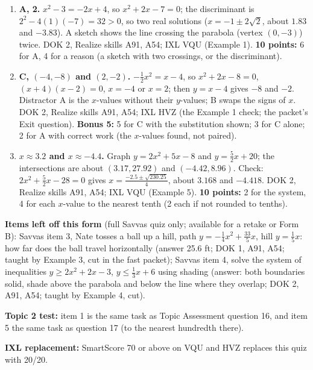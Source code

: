 \documentclass[11pt]{article}
\begin{document}
\begin{enumerate}
\item[\textbf{1.}] \textbf{A, 2.} $x^2-3=-2x+4$, so $x^2+2x-7=0$; the discriminant is $2^2-4(1)(-7)=32>0$, so two real solutions ($x=-1\pm2\sqrt2$, about $1.83$ and $-3.83$). A sketch shows the line crossing the parabola (vertex $(0,-3)$) twice. DOK 2, Realize skills A91, A54; IXL VQU (Example 1). \textbf{10 points:} 6 for A, 4 for a reason (a sketch with two crossings, or the discriminant).
\item[\textbf{2.}] \textbf{C, $(-4,-8)$ and $(2,-2)$.} $-\tfrac12x^2=x-4$, so $x^2+2x-8=0$, $(x+4)(x-2)=0$, $x=-4$ or $x=2$; then $y=x-4$ gives $-8$ and $-2$. Distractor A is the $x$-values without their $y$-values; B swaps the signs of $x$. DOK 2, Realize skills A91, A54; IXL HVZ (the Example 1 check; the packet's Exit question). \textbf{Bonus 5:} 5 for C with the substitution shown; 3 for C alone; 2 for A with correct work (the $x$-values found, not paired).
\item[\textbf{5.}] \textbf{$x\approx3.2$ and $x\approx-4.4$.} Graph $y=2x^2+5x-8$ and $y=\tfrac52x+20$; the intersections are about $(3.17,27.92)$ and $(-4.42,8.96)$. Check: $2x^2+\tfrac52x-28=0$ gives $x=\frac{-2.5\pm\sqrt{230.25}}{4}$, about $3.168$ and $-4.418$. DOK 2, Realize skills A91, A54; IXL VQU (Example 5). \textbf{10 points:} 2 for the system, 4 for each $x$-value to the nearest tenth (2 each if not rounded to tenths).
\end{enumerate}

\textbf{Items left off this form} (full Savvas quiz only; available for a retake or Form B): Savvas item 3, Nate tosses a ball up a hill, path $y=-\tfrac14x^2+\tfrac{33}{5}x$, hill $y=\tfrac15x$: how far does the ball travel horizontally (answer 25.6 ft; DOK 1, A91, A54; taught by Example 3, cut in the fast packet); Savvas item 4, solve the system of inequalities $y\geq2x^2+2x-3$, $y\leq\tfrac13x+6$ using shading (answer: both boundaries solid, shade above the parabola and below the line where they overlap; DOK 2, A91, A54; taught by Example 4, cut).

\textbf{Topic 2 test:} item 1 is the same task as Topic Assessment question 16, and item 5 the same task as question 17 (to the nearest hundredth there).

\textbf{IXL replacement:} SmartScore 70 or above on VQU and HVZ replaces this quiz with 20/20.
\end{document}
